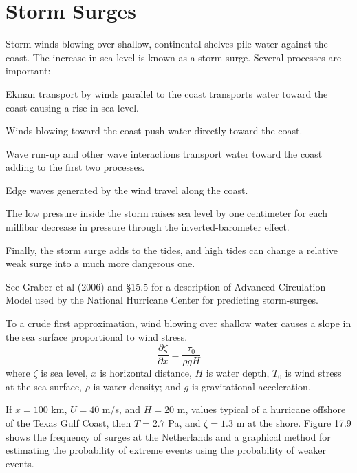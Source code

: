 \section{Storm Surges}
Storm winds blowing over shallow, continental
shelves pile water against the coast. The increase in sea level is
known as a storm surge. Several processes are important:
\begin{enumerate}
\vitem Ekman transport by winds parallel to the
coast transports water toward the coast causing a rise in sea level.

\vitem Winds blowing toward the coast push water directly toward the
coast.

\vitem Wave run-up and other wave interactions
transport water toward the
coast adding to the first two processes.

\vitem Edge waves generated by the wind travel along the coast.

\vitem The low pressure inside the storm raises sea level by one
centimeter for each millibar decrease in pressure through the
inverted-barometer effect.

\vitem Finally, the storm surge adds to the tides, and high tides can
change a relative weak surge into a much more dangerous one.
\end{enumerate}
See Graber et al (2006) and \S 15.5 for a description of Advanced
Circulation Model used by the National Hurricane Center for predicting
storm-surges.

To a crude first approximation, wind blowing over shallow water causes
a slope in the sea surface proportional to wind stress.
\begin{equation}
\frac{\partial \zeta }{\partial x}= \frac{\tau _{0}}{\rho g H}
\end{equation}
where $\zeta $ is sea level, $x$ is horizontal distance, $H$ is water
depth, $T_{0}$ is wind stress at the sea surface, $\rho $ is water
density; and $g$ is gravitational acceleration.

If $x=100$ km, $U=40$ m/s, and $H=20$ m, values typical of a hurricane
offshore of the Texas Gulf Coast, then $T= 2.7$ Pa, and $\zeta = 1.3$
m at the shore. Figure 17.9 shows the frequency of surges at the
Netherlands and a graphical method for estimating the probability of
extreme events using the probability of weaker events.


